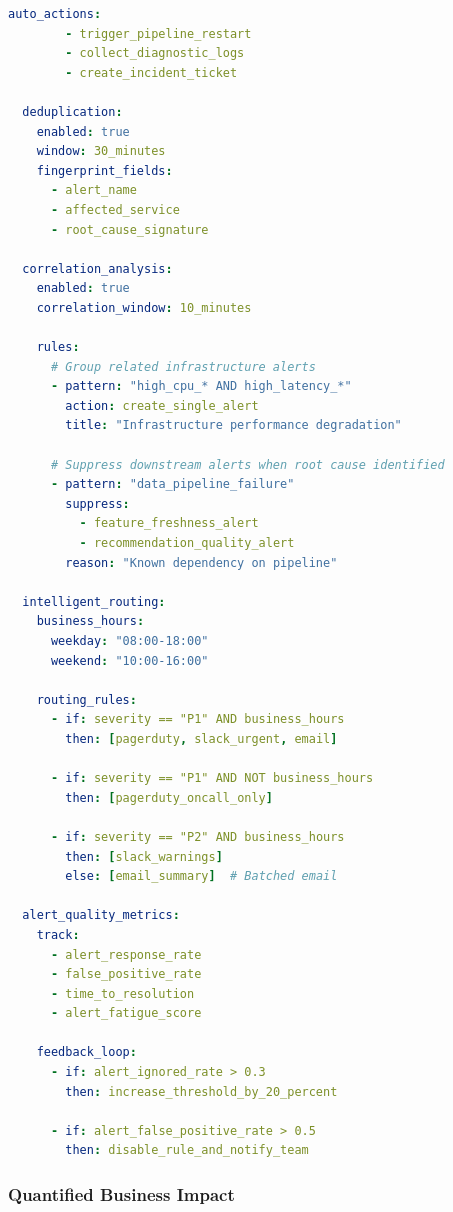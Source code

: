 \begin{lstlisting}[language=yaml, caption={Intelligent Alert Management Configuration}]
      auto_actions:
        - trigger_pipeline_restart
        - collect_diagnostic_logs
        - create_incident_ticket

  deduplication:
    enabled: true
    window: 30_minutes
    fingerprint_fields:
      - alert_name
      - affected_service
      - root_cause_signature

  correlation_analysis:
    enabled: true
    correlation_window: 10_minutes

    rules:
      # Group related infrastructure alerts
      - pattern: "high_cpu_* AND high_latency_*"
        action: create_single_alert
        title: "Infrastructure performance degradation"

      # Suppress downstream alerts when root cause identified
      - pattern: "data_pipeline_failure"
        suppress:
          - feature_freshness_alert
          - recommendation_quality_alert
        reason: "Known dependency on pipeline"

  intelligent_routing:
    business_hours:
      weekday: "08:00-18:00"
      weekend: "10:00-16:00"

    routing_rules:
      - if: severity == "P1" AND business_hours
        then: [pagerduty, slack_urgent, email]

      - if: severity == "P1" AND NOT business_hours
        then: [pagerduty_oncall_only]

      - if: severity == "P2" AND business_hours
        then: [slack_warnings]
        else: [email_summary]  # Batched email

  alert_quality_metrics:
    track:
      - alert_response_rate
      - false_positive_rate
      - time_to_resolution
      - alert_fatigue_score

    feedback_loop:
      - if: alert_ignored_rate > 0.3
        then: increase_threshold_by_20_percent

      - if: alert_false_positive_rate > 0.5
        then: disable_rule_and_notify_team
\end{lstlisting}

\subsubsection{Quantified Business Impact}

